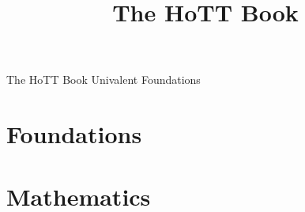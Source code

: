 \documentclass[openany,11pt]{book}
\begin{document}
\title{The HoTT Book}

%
\thispagestyle{empty}%
\vspace*{0.05\textheight}
{\centering
{\color{orange}\fontsize{70}{100}\selectfont The HoTT Book}
\vfill
{\color{orange}\fontsize{45}{60}\selectfont Univalent Foundations}\par
}
\vspace*{0.02\textheight}

\clearpage
\restoregeometry



\tableofcontents



\part{Foundations}





%









\part{Mathematics}










%

%



\end{document}
